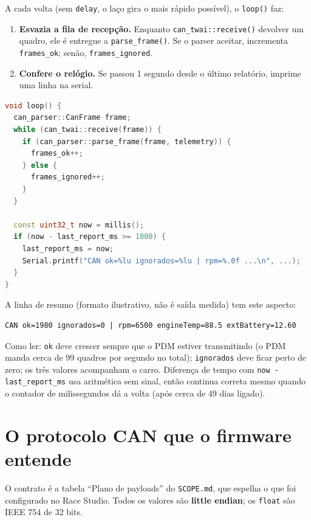 \documentclass[11pt,a4paper]{article}
\begin{document}
A cada volta (sem \texttt{delay}, o laço gira o mais rápido possível), o \texttt{loop()} faz:

\begin{enumerate}
    \item \textbf{Esvazia a fila de recepção.} Enquanto \texttt{can\_twai::receive()} devolver um quadro, ele é entregue a \texttt{parse\_frame()}. Se o parser aceitar, incrementa \texttt{frames\_ok}; senão, \texttt{frames\_ignored}.
    \item \textbf{Confere o relógio.} Se passou 1 segundo desde o último relatório, imprime uma linha na serial.
\end{enumerate}

\begin{lstlisting}[language=C++,caption={O coração do main.cpp}]
void loop() {
  can_parser::CanFrame frame;
  while (can_twai::receive(frame)) {
    if (can_parser::parse_frame(frame, telemetry)) {
      frames_ok++;
    } else {
      frames_ignored++;
    }
  }

  const uint32_t now = millis();
  if (now - last_report_ms >= 1000) {
    last_report_ms = now;
    Serial.printf("CAN ok=%lu ignorados=%lu | rpm=%.0f ...\n", ...);
  }
}
\end{lstlisting}

A linha de resumo (formato ilustrativo, não é saída medida) tem este aspecto:

\begin{lstlisting}[caption={Exemplo do formato da linha na serial}]
CAN ok=1980 ignorados=0 | rpm=6500 engineTemp=88.5 extBattery=12.60
\end{lstlisting}

Como ler: \texttt{ok} deve crescer sempre que o PDM estiver transmitindo (o PDM manda cerca de 99 quadros por segundo no total); \texttt{ignorados} deve ficar perto de zero; os três valores acompanham o carro. Diferença de tempo com \texttt{now - last\_report\_ms} usa aritmética sem sinal, então continua correta mesmo quando o contador de milissegundos dá a volta (após cerca de 49 dias ligado).

\section{O protocolo CAN que o firmware entende}

O contrato é a tabela ``Plano de payloads'' do \texttt{SCOPE.md}, que espelha o que foi configurado no Race Studio. Todos os valores são \textbf{little endian}; os \texttt{float} são IEEE 754 de 32 bits.
\end{document}
